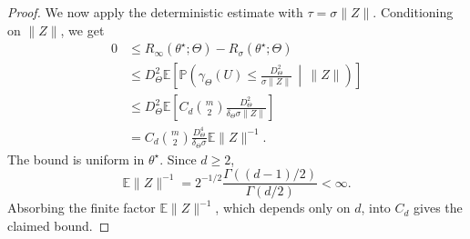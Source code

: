 \documentclass[10pt,a4paper]{amsart}
\newcommand{\E}{\mathbb{E}}
\renewcommand{\P}{\mathbb{P}}
\begin{document}
\begin{proof}
We now apply the deterministic estimate with
$\tau=\sigma\|Z\|$. Conditioning on $\|Z\|$, we get
\[
\begin{aligned}
0
&\le
R_\infty(\theta^\star;\Theta)
-
R_\sigma(\theta^\star;\Theta)  \\
&\le
D_{\Theta}^2
\E\left[
\P\left(
    \gamma_\Theta(U)
    \le
    \frac{D_{\Theta}^2}{\sigma\|Z\|}
    \,\middle|\, \|Z\|
\right)
\right] \\
&\le
D_{\Theta}^2
\E\left[
    C_d \binom{m}{2}
    \frac{D_{\Theta}^2}{\delta_\Theta\sigma\|Z\|}
\right] \\
&=
C_d \binom{m}{2}
\frac{D_{\Theta}^4}{\delta_\Theta\sigma}
\E\|Z\|^{-1}.
\end{aligned}
\]
The bound is uniform in $\theta^\star$. Since $d\ge2$,
\[
    \E\|Z\|^{-1}
    =
    2^{-1/2}
    \frac{\Gamma((d-1)/2)}{\Gamma(d/2)}
    <
    \infty.
\]
Absorbing the finite factor $\E\|Z\|^{-1}$, which depends only on $d$, into $C_d$
gives the claimed bound.
\end{proof}
\end{document}
